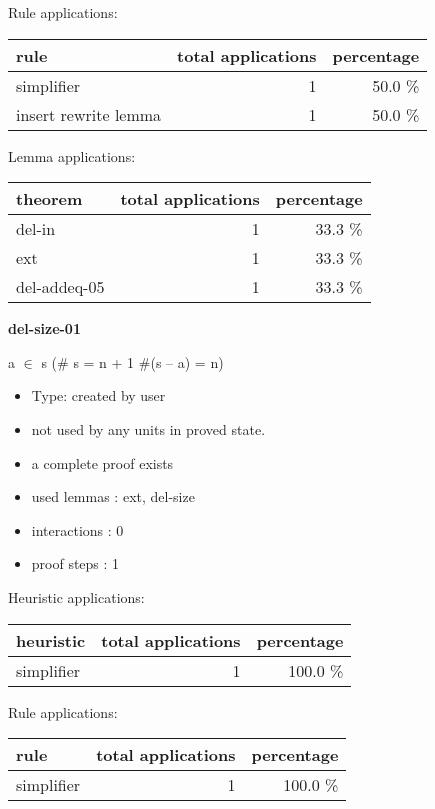 \documentclass[a4paper]{article}
\begin{document}
Rule applications:

\begin{supertabular}{l|r|r}
rule	        & total applications & percentage \\ \hline
simplifier & 1 & 50.0 \% \\
insert rewrite lemma & 1 & 50.0 \% \\

\end{supertabular}

Lemma applications:

\begin{supertabular}{l|r|r}
theorem	        & total applications & percentage \\ \hline
del-in & 1 & 33.3 \% \\
ext & 1 & 33.3 \% \\
del-addeq-05 & 1 & 33.3 \% \\

\end{supertabular}
\pagebreak

{\LARGE\bf del-size-01}\label{lemma-del-size-01}

\medskip

 \Fol a $\in$ s \Imp (\# s = n + 1 \Equiv \#(s -- a) = n)

\begin{itemize}

\item Type: created by user

\item not used by any units in proved state.
\item       a complete proof exists
\item       used lemmas  : ext, del-size
\item       interactions : 0
\item       proof steps  : 1
\end{itemize}

\medskip


Heuristic applications:

\begin{supertabular}{l|r|r}
heuristic	& total applications & percentage \\ \hline
simplifier & 1 & 100.0 \% \\

\end{supertabular}

Rule applications:

\begin{supertabular}{l|r|r}
rule	        & total applications & percentage \\ \hline
simplifier & 1 & 100.0 \% \\

\end{supertabular}
\end{document}
